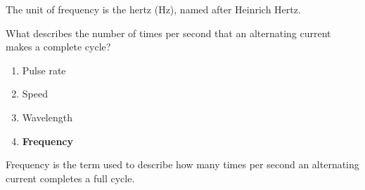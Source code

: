The unit of frequency is the hertz (Hz), named after Heinrich Hertz.

\begin{tcolorbox}[colback=gray!10!white,colframe=black!75!black,title={T5A12}]
What describes the number of times per second that an alternating current makes a complete cycle?
\begin{enumerate}[label=\Alph*),noitemsep]
    \item Pulse rate
    \item Speed
    \item Wavelength
    \item \textbf{Frequency}
\end{enumerate}
\end{tcolorbox}

Frequency is the term used to describe how many times per second an alternating current completes a full cycle.
